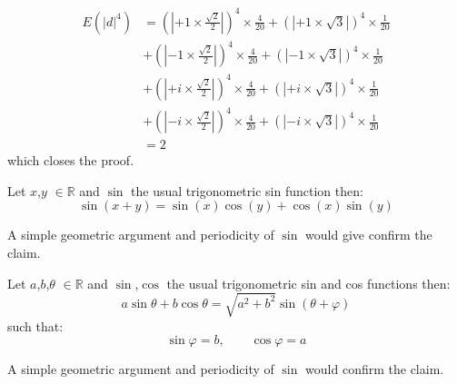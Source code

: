 \begin{Proof}
\begin{equation*}
	  \end{equation*}
	  \begin{equation*}
		\begin{split}
		E(\left|d\right|^4) &= \left(\left|+1 \times \frac{\sqrt{2}}{2}\right|\right)^4 \times \frac{4}{20} + \left(\left|+1 \times \sqrt{3}\right|\right)^4 \times \frac{1}{20}\\
		                    &+\left(\left|-1 \times \frac{\sqrt{2}}{2}\right|\right)^4 \times \frac{4}{20}+\left(\left|-1 \times \sqrt{3}\right|\right)^4 \times \frac{1}{20}\\
		                    &+ \left(\left|+i \times \frac{\sqrt{2}}{2}\right|\right)^4 \times \frac{4}{20} + \left(\left|+i \times \sqrt{3}\right|\right)^4 \times \frac{1}{20}\\
							&+\left(\left|-i \times \frac{\sqrt{2}}{2}\right|\right)^4 \times \frac{4}{20}+\left(\left|-i \times \sqrt{3}\right|\right)^4 \times \frac{1}{20}\\ 
			 &= 2
		\end{split}
	 \end{equation*}
	 which closes the proof.
\end{Proof}




\begin{Prop}
Let $x$,$y$ $\in \mathbb{R}$ and $\sin$ the usual trigonometric sin function then:
\begin{equation*}
	\sin(x+y) = \sin(x)\cos(y)+\cos(x)\sin(y)
\end{equation*}
\end{Prop}
\begin{Proof}
	A simple geometric argument and periodicity of $\sin$ would give confirm the claim.
\end{Proof}


\begin{Prop}
	Let $a$,$b$,$\theta$ $\in \mathbb{R}$ and $\sin$,$\cos$ the usual trigonometric sin and cos functions then:
	\begin{equation*}
		a\sin \theta+b\cos \theta  = \sqrt{a^2+b^2}\sin(\theta + \varphi)
	\end{equation*}
	such that:
	\begin{equation*}
		\sin\varphi=b, \qquad \cos\varphi = a
	\end{equation*}
	\end{Prop}
	\begin{Proof}
		A simple geometric argument and periodicity of $\sin$ would confirm the claim.
	\end{Proof}

